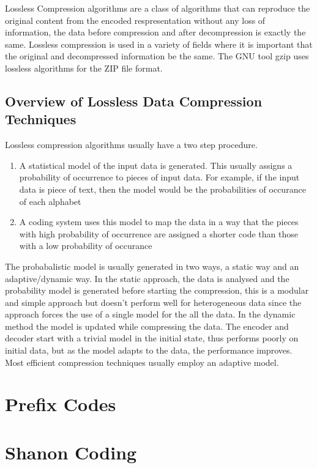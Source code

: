 \documentclass{article}
\begin{document}
Lossless Compression algorithms are a class of algorithms that can reproduce the original content from the encoded respresentation without any loss of information, the data before compression and after decompression is exactly the same. Lossless compression is used in a variety of fields where it is important that the original and decompressed information be the same. The GNU tool gzip uses lossless algorithms for the ZIP file format.

\subsection{Overview of Lossless Data Compression Techniques}

Lossless compression algorithms usually have a two step procedure. 
\begin{enumerate}
	\item A statistical model of the input data is generated. This usually assigns a probability of occurrence to pieces of input data. For example, if the input data is piece of text, then the model would be the probabilities of occurance of each alphabet
	
	\item A coding system uses this model to map the data in a way that the pieces with high probability of occurrence are assigned a shorter code than those with a low probability of occurance
\end{enumerate}

The probabalistic model is usually generated in two ways, a static way and an adaptive/dynamic way. In the static approach, the data is analysed and the probability model is generated before starting the compression, this is a modular and simple approach but doesn't perform well for heterogeneous data since the approach forces the use of a single model for the all the data. In the dynamic method the model is updated while compressing the data. The encoder and decoder start with a trivial model in the initial state, thus performs poorly on initial data, but as the model adapts to the data, the performance improves. Most efficient compression techniques usually employ an adaptive model.

\section{Prefix Codes}
	
\section {Shanon Coding}
\end{document}
